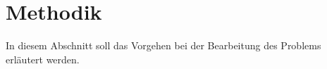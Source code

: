 \section{Methodik}

In diesem Abschnitt soll das Vorgehen bei der Bearbeitung des Problems erläutert werden.







